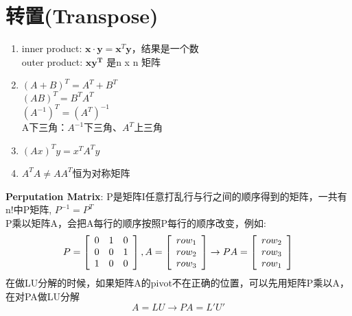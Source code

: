 \documentclass{book}
\begin{document}
\section{转置(Transpose)}
\begin{enumerate}
  \item inner product: $\boldsymbol{x\cdot y}=\boldsymbol{x}^T\boldsymbol{y}$，结果是一个数\\ 
        outer product: $\boldsymbol{xy^T}$ 是n x n 矩阵
  \item $(A+B)^T=A^T+B^T$\\ 
        $(AB)^T=B^TA^T$\\
        $(A^{-1})^T=(A^T)^{-1}$\\ 
        A下三角：$A^{-1}$下三角、$A^T$上三角\\
  \item $(Ax)^Ty=x^TA^Ty$
  \item $A^TA\neq AA^T$恒为对称矩阵
\end{enumerate}
\textbf{Perputation Matrix}: 
P是矩阵I任意打乱行与行之间的顺序得到的矩阵，一共有n!中P矩阵, 
$P^{-1}=P^T$\\ 
P乘以矩阵A，会把A每行的顺序按照P每行的顺序改变，例如:
\begin{equation*}
 \begin{aligned}
  P=\left[
    \begin{array}{c c c }
      0 & 1 & 0\\ 
      0 & 0 & 1\\ 
      1 & 0 & 0
    \end{array}
  \right],  
  A=\left[
    \begin{array}{c }
     row_1\\ 
     row_2\\ 
     row_3
    \end{array}
  \right]\rightarrow
  PA=\left[
    \begin{array}{c }
     row_2\\ 
     row_3\\ 
     row_1
    \end{array}
  \right]
 \end{aligned} 
\end{equation*}
在做LU分解的时候，如果矩阵A的pivot不在正确的位置，可以先用矩阵P乘以A，在对PA做LU分解
\begin{equation*}
 A=LU \rightarrow PA=L'U'
\end{equation*}

\end{document}
